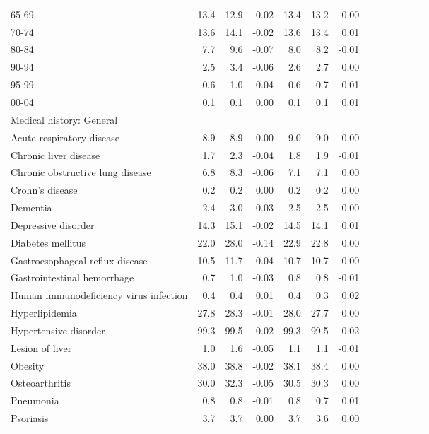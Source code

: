 \documentclass[11pt,]{article}
\begin{document}
\begin{longtable}{lrrrrrrrrrrrr}
      65-69 & 13.4 &  12.9 &  0.02 & 13.4 &  13.2 &  0.00 \\ 
      70-74 & 13.6 &  14.1 & -0.02 & 13.6 &  13.4 &  0.01 \\ 
      80-84 &  7.7 &   9.6 & -0.07 &  8.0 &   8.2 & -0.01 \\ 
      90-94 &  2.5 &   3.4 & -0.06 &  2.6 &   2.7 &  0.00 \\ 
      95-99 &  0.6 &   1.0 & -0.04 &  0.6 &   0.7 & -0.01 \\ 
      00-04 &  0.1 &   0.1 &  0.00 &  0.1 &   0.1 &  0.01 \\ 
  Medical history: General &    &     &     &    &     &     \\ 
      Acute respiratory disease &  8.9 &   8.9 &  0.00 &  9.0 &   9.0 &  0.00 \\ 
      Chronic liver disease &  1.7 &   2.3 & -0.04 &  1.8 &   1.9 & -0.01 \\ 
      Chronic obstructive lung disease &  6.8 &   8.3 & -0.06 &  7.1 &   7.1 &  0.00 \\ 
      Crohn's disease &  0.2 &   0.2 &  0.00 &  0.2 &   0.2 &  0.00 \\ 
      Dementia &  2.4 &   3.0 & -0.03 &  2.5 &   2.5 &  0.00 \\ 
      Depressive disorder & 14.3 &  15.1 & -0.02 & 14.5 &  14.1 &  0.01 \\ 
      Diabetes mellitus & 22.0 &  28.0 & -0.14 & 22.9 &  22.8 &  0.00 \\ 
      Gastroesophageal reflux disease & 10.5 &  11.7 & -0.04 & 10.7 &  10.7 &  0.00 \\ 
      Gastrointestinal hemorrhage &  0.7 &   1.0 & -0.03 &  0.8 &   0.8 & -0.01 \\ 
      Human immunodeficiency virus infection &  0.4 &   0.4 &  0.01 &  0.4 &   0.3 &  0.02 \\ 
      Hyperlipidemia & 27.8 &  28.3 & -0.01 & 28.0 &  27.7 &  0.00 \\ 
      Hypertensive disorder & 99.3 &  99.5 & -0.02 & 99.3 &  99.5 & -0.02 \\ 
      Lesion of liver &  1.0 &   1.6 & -0.05 &  1.1 &   1.1 & -0.01 \\ 
      Obesity & 38.0 &  38.8 & -0.02 & 38.1 &  38.4 &  0.00 \\ 
      Osteoarthritis & 30.0 &  32.3 & -0.05 & 30.5 &  30.3 &  0.00 \\ 
      Pneumonia &  0.8 &   0.8 & -0.01 &  0.8 &   0.7 &  0.01 \\ 
      Psoriasis &  3.7 &   3.7 &  0.00 &  3.7 &   3.6 &  0.00 \\ 

\end{longtable}
\end{document}
